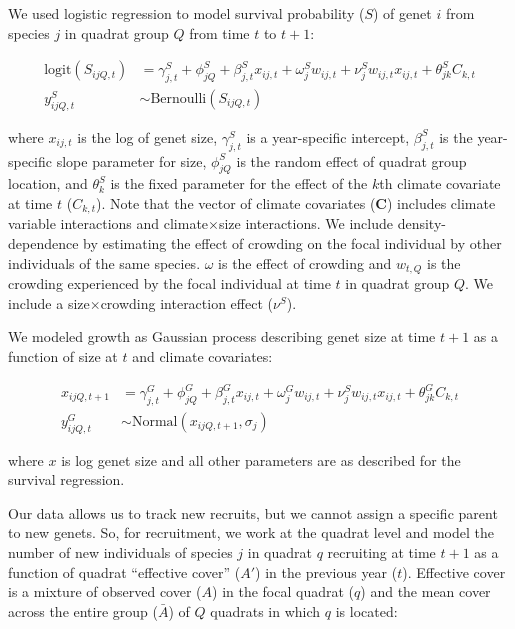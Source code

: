 \documentclass[12pt,]{article}
\begin{document}
We used logistic regression to model survival probability ($S$) of genet
$i$ from species $j$ in quadrat group $Q$ from time $t$ to $t+1$:

\begin{align}
\text{logit}(S_{ijQ,t}) &= \gamma^{S}_{j,t} + \phi^{S}_{jQ} + \beta^{S}_{j,t}x_{ij,t} + \omega^{S}_{j}w_{ij,t} + \nu^{S}_{j}w_{ij,t}x_{ij,t} + \theta^{S}_{jk}C_{k,t} \\
y^{S}_{ijQ,t} &\sim \text{Bernoulli}(S_{ijQ,t})
\end{align}

where $x_{ij,t}$ is the log of genet size, $\gamma^{S}_{j,t}$ is a
year-specific intercept, $\beta^{S}_{j,t}$ is the year-specific slope
parameter for size, $\phi^{S}_{jQ}$ is the random effect of quadrat
group location, and $\theta^{S}_{k}$ is the fixed parameter for the
effect of the $k$th climate covariate at time $t$ ($C_{k,t}$). Note that
the vector of climate covariates (\textbf{C}) includes climate variable
interactions and climate$\times$size interactions. We include
density-dependence by estimating the effect of crowding on the focal
individual by other individuals of the same species. $\omega$ is the
effect of crowding and $w_{t,Q}$ is the crowding experienced by the
focal individual at time $t$ in quadrat group $Q$. We include a
size$\times$crowding interaction effect ($\nu^{S}$).

We modeled growth as Gaussian process describing genet size at time
$t+1$ as a function of size at $t$ and climate covariates:

\begin{align}
x_{ijQ,t+1} &= \gamma^{G}_{j,t} + \phi^{G}_{jQ} + \beta^{G}_{j,t}x_{ij,t} + \omega^{G}_{j}w_{ij,t} + \nu^{S}_{j}w_{ij,t}x_{ij,t} + \theta^{G}_{jk}C_{k,t} \\
y^{G}_{ijQ,t} &\sim \text{Normal}(x_{ijQ,t+1}, \sigma_{j})
\end{align}

where $x$ is log genet size and all other parameters are as described
for the survival regression.

Our data allows us to track new recruits, but we cannot assign a
specific parent to new genets. So, for recruitment, we work at the
quadrat level and model the number of new individuals of species $j$ in
quadrat $q$ recruiting at time $t+1$ as a function of quadrat
``effective cover'' ($A'$) in the previous year ($t$). Effective cover
is a mixture of observed cover ($A$) in the focal quadrat ($q$) and the
mean cover across the entire group ($\bar{A}$) of $Q$ quadrats in which
$q$ is located:
\end{document}
